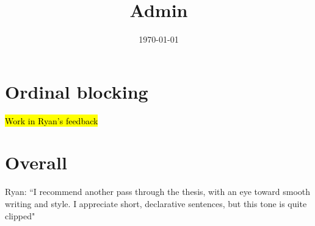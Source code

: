 \documentclass[12pt]{article}
\title{Admin}
\date{\today}
\begin{document}
\maketitle

\section*{Ordinal blocking}
	\begin{coi}
		\item \hl{Work in Ryan's feedback}
	\end{coi}
	
\section*{Overall}
	\begin{coi}
		\item Ryan: ``I recommend another pass through the thesis, with an eye toward smooth writing and style. I appreciate short, declarative sentences, but this tone is quite clipped"
	\end{coi}
\end{document}
